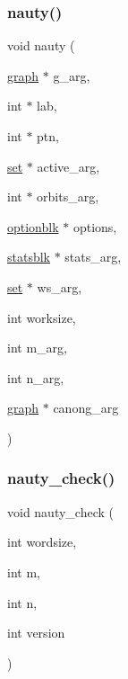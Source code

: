 \subsubsection{\texorpdfstring{nauty()}{nauty()}}
{\footnotesize\ttfamily void nauty (\begin{DoxyParamCaption}\item[{\mbox{\hyperlink{nauty_8h_a28c08db7c5948ab173e0f0497773f2f1}{graph}} $\ast$}]{g\+\_\+arg,  }\item[{int $\ast$}]{lab,  }\item[{int $\ast$}]{ptn,  }\item[{\mbox{\hyperlink{nauty_8h_a9690bea211101f22a5e154087590c3da}{set}} $\ast$}]{active\+\_\+arg,  }\item[{int $\ast$}]{orbits\+\_\+arg,  }\item[{\mbox{\hyperlink{structoptionblk}{optionblk}} $\ast$}]{options,  }\item[{\mbox{\hyperlink{structstatsblk}{statsblk}} $\ast$}]{stats\+\_\+arg,  }\item[{\mbox{\hyperlink{nauty_8h_a9690bea211101f22a5e154087590c3da}{set}} $\ast$}]{ws\+\_\+arg,  }\item[{int}]{worksize,  }\item[{int}]{m\+\_\+arg,  }\item[{int}]{n\+\_\+arg,  }\item[{\mbox{\hyperlink{nauty_8h_a28c08db7c5948ab173e0f0497773f2f1}{graph}} $\ast$}]{canong\+\_\+arg }\end{DoxyParamCaption})}

\mbox{\label{_l_i_b_2_g_a_l_o_i_s_2nauty_8_c_a419220950218f031551b5efb3b8b0c36}} 
\subsubsection{\texorpdfstring{nauty\+\_\+check()}{nauty\_check()}}
{\footnotesize\ttfamily void nauty\+\_\+check (\begin{DoxyParamCaption}\item[{int}]{wordsize,  }\item[{int}]{m,  }\item[{int}]{n,  }\item[{int}]{version }\end{DoxyParamCaption})}

